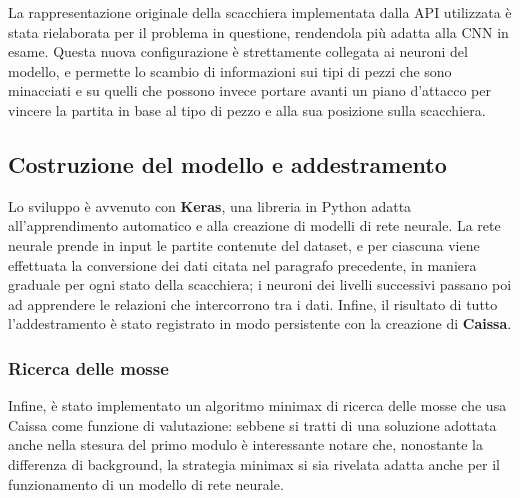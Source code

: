 La rappresentazione originale della scacchiera implementata dalla API utilizzata è stata rielaborata per il problema in questione, rendendola più adatta alla CNN in esame. 
Questa nuova configurazione è strettamente collegata ai neuroni del modello, e permette lo scambio di informazioni sui tipi di pezzi che sono minacciati e su quelli che possono invece portare avanti un piano d'attacco per vincere la partita in base al tipo di pezzo e alla sua posizione sulla scacchiera. %

\subsection{Costruzione del modello e addestramento}
Lo sviluppo è avvenuto con \textbf{Keras}, una libreria in Python adatta all'apprendimento automatico e alla creazione di modelli di rete neurale. La rete neurale prende in input le partite contenute del dataset, e per ciascuna viene effettuata la conversione dei dati citata nel paragrafo precedente, in maniera graduale per ogni stato della scacchiera; i neuroni dei livelli successivi passano poi ad apprendere le relazioni che intercorrono tra i dati. Infine, il risultato di tutto l'addestramento è stato registrato in modo persistente con la creazione di \textbf{Caissa}.%


\subsubsection{Ricerca delle mosse}
Infine, è stato implementato un algoritmo minimax di ricerca delle mosse che usa Caissa come funzione di valutazione: sebbene si tratti di una soluzione adottata anche nella stesura del primo modulo è interessante notare che, nonostante la differenza di background, la strategia minimax si sia rivelata adatta anche per il funzionamento di un modello di rete neurale.

